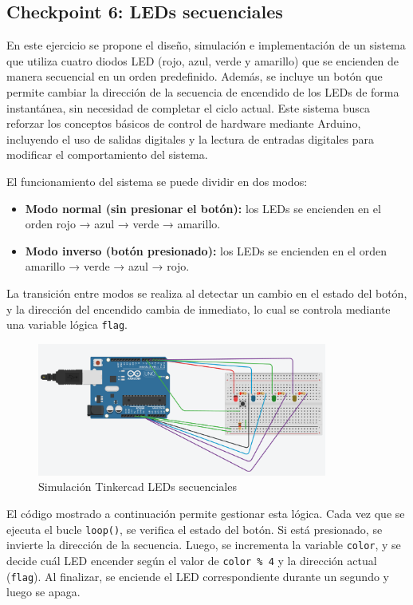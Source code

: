 \documentclass{article}
\begin{document}
\subsection{Checkpoint 6: LEDs secuenciales}

En este ejercicio se propone el diseño, simulación e implementación de un sistema que utiliza cuatro diodos LED (rojo, azul, verde y amarillo) que se encienden de manera secuencial en un orden predefinido. Además, se incluye un botón que permite cambiar la dirección de la secuencia de encendido de los LEDs de forma instantánea, sin necesidad de completar el ciclo actual. Este sistema busca reforzar los conceptos básicos de control de hardware mediante Arduino, incluyendo el uso de salidas digitales y la lectura de entradas digitales para modificar el comportamiento del sistema.

El funcionamiento del sistema se puede dividir en dos modos: 
\begin{itemize}
    \item \textbf{Modo normal (sin presionar el botón):} los LEDs se encienden en el orden rojo → azul → verde → amarillo.
    \item \textbf{Modo inverso (botón presionado):} los LEDs se encienden en el orden amarillo → verde → azul → rojo.
\end{itemize}

La transición entre modos se realiza al detectar un cambio en el estado del botón, y la dirección del encendido cambia de inmediato, lo cual se controla mediante una variable lógica \texttt{flag}.

\begin{figure}[H]
    \centering
    \includegraphics[width=0.85\textwidth]{./img/ckpt_6_0.png}
    \caption{Simulación Tinkercad LEDs secuenciales}
    \label{fig:leds_secuenciales}
\end{figure}

El código mostrado a continuación permite gestionar esta lógica. Cada vez que se ejecuta el bucle \texttt{loop()}, se verifica el estado del botón. Si está presionado, se invierte la dirección de la secuencia. Luego, se incrementa la variable \texttt{color}, y se decide cuál LED encender según el valor de \texttt{color \% 4} y la dirección actual (\texttt{flag}). Al finalizar, se enciende el LED correspondiente durante un segundo y luego se apaga.
\end{document}
